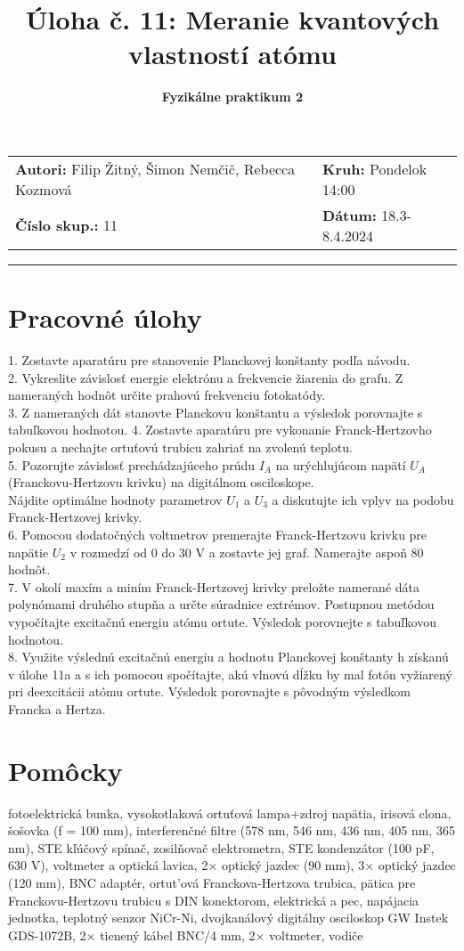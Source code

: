 \documentclass{article}
\title{\textbf{Úloha č. 11: Meranie kvantových vlastností atómu}}
\author{\textbf{Fyzikálne praktikum 2}}
\date{}
\begin{document}
\maketitle



\begin{tabular}{ll}
\textbf{Autori:} {Filip Žitný, Šimon Nemčič, Rebecca Kozmová}&
\textbf{Kruh:} {Pondelok 14:00} \\ 
\textbf{Číslo skup.:} {11} &
\textbf{Dátum: }18.3-8.4.2024\\
\end{tabular}
\hrule


\section{Pracovné úlohy}
1. Zostavte aparatúru pre stanovenie Planckovej konštanty podľa návodu.\\
2. Vykreslite závislosť energie elektrónu a frekvencie  žiarenia do grafu. Z nameraných hodnôt určite prahovú frekvenciu fotokatódy.\\
3. Z nameraných dát stanovte Planckovu konštantu a výsledok porovnajte s tabuľkovou hodnotou.
4. Zostavte aparatúru pre vykonanie Franck-Hertzovho pokusu a nechajte ortuťovú trubicu zahriať na zvolenú teplotu.\\
5. Pozorujte závislosť prechádzajúceho prúdu $I_A$ na urýchlujúcom napätí $U_A$ (Franckovu-Hertzovu krivku) na digitálnom osciloskope. \\Nájdite optimálne hodnoty parametrov $U_1$ a $U_3$ a diskutujte ich vplyv na podobu Franck-Hertzovej krivky.\\
6. Pomocou dodatočných voltmetrov  premerajte Franck-Hertzovu krivku pre napätie $U_2$ v
rozmedzí  od 0 do 30 V a zostavte jej graf. Namerajte aspoň 80 hodnôt.\\
7. V okolí maxím a miním Franck-Hertzovej krivky preložte namerané dáta polynómami  druhého
stupňa a určte súradnice  extrémov. Postupnou metódou vypočítajte  excitačnú  energiu atómu ortute. Výsledok porovnejte s tabuľkovou hodnotou.\\
8. Využite výslednú  excitačnú energiu a hodnotu Planckovej konštanty h získanú v úlohe 11a a s ich pomocou spočítajte, akú vlnovú dĺžku  by mal fotón vyžiarený pri  deexcitácii  atómu 
ortute. Výsledok porovnajte s pôvodným výsledkom Francka a Hertza.\\

\section{Pomôcky}
fotoelektrická bunka, vysokotlaková ortuťová lampa+zdroj napätia, irisová clona, šošovka (f = 100 mm),
interferenčné filtre (578 nm, 546 nm, 436 nm, 405 nm, 365 nm), STE kľúčový spínač, zosilňovač elektrometra, STE kondenzátor (100 pF, 630 V), voltmeter a optická lavica, 2× optický jazdec (90 mm),
3× optický jazdec (120 mm), BNC adaptér, ortut'ová Franckova-Hertzova trubica, pätica pre Franckovu-Hertzovu trubicu s DIN konektorom, elektrická a pec, napájacia jednotka, teplotný senzor NiCr-Ni, dvojkanálový digitálny osciloskop GW
Instek GDS-1072B, 2× tienený kábel BNC/4 mm, 2× voltmeter, vodiče
\end{document}
